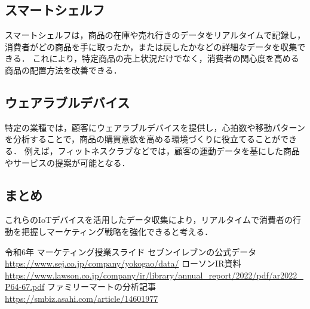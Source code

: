 \documentclass[titlepage,a4paper]{jsarticle}
\begin{document}
\subsection{スマートシェルフ}
スマートシェルフは，商品の在庫や売れ行きのデータをリアルタイムで記録し，消費者がどの商品を手に取ったか，または戻したかなどの詳細なデータを収集できる．
これにより，特定商品の売上状況だけでなく，消費者の関心度を高める商品の配置方法を改善できる．

\subsection{ウェアラブルデバイス}
特定の業種では，顧客にウェアラブルデバイスを提供し，心拍数や移動パターンを分析することで，商品の購買意欲を高める環境づくりに役立てることができる．
例えば，フィットネスクラブなどでは，顧客の運動データを基にした商品やサービスの提案が可能となる．

\subsection{まとめ}
これらのIoTデバイスを活用したデータ収集により，リアルタイムで消費者の行動を把握しマーケティング戦略を強化できると考える．






\begin{thebibliography}{99}
   令和6年 マーケティング授業スライド
   セブンイレブンの公式データ\url{https://www.sej.co.jp/company/yokogao/data/}
   ローソンIR資料\url{https://www.lawson.co.jp/company/ir/library/annual_report/2022/pdf/ar2022_P64-67.pdf}
   ファミリーマートの分析記事\url{https://smbiz.asahi.com/article/14601977}
\end{thebibliography}
\end{document}
